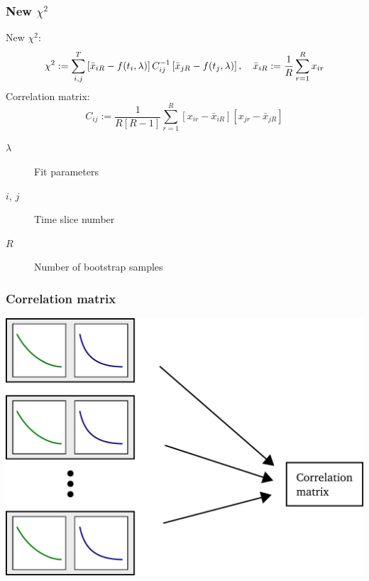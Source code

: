 \documentclass[english, fleqn]{beamer}
\begin{document}
\begin{frame}
    \frametitle{New $\chi^2$}

    New $\chi^2$:
    \[
        \chi^2 := \sum_{i, j}^T
        \left[ \bar x_{iR} - f(t_i, \lambda) \right]
        C^{-1}_{ij}
        \left[ \bar x_{jR} - f(t_j, \lambda) \right]
        ,\quad
        \bar x_{iR} := \frac 1R \sum_{r=1}^R x_{ir}
    \]
    Correlation matrix:
    \[
        C_{ij} := \frac{1}{R[R-1]} \sum_{r=1}^R
        [x_{ir} - \bar x_{iR}] [x_{jr} - \bar x_{jR}]
    \]

    \begin{description}
        \item[$\lambda$] Fit parameters
        \item[$i$, $j$] Time slice number
        \item[$R$] Number of bootstrap samples
    \end{description}
\end{frame}

%

\begin{frame}
    \frametitle{Correlation matrix}
    \begin{center}
        \includegraphics[scale=\scale]{sketches/05-matrix.pdf}
    \end{center}
\end{frame}
\end{document}
